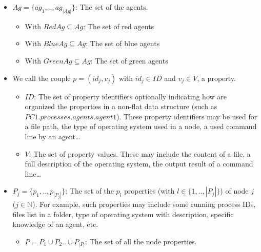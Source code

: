 \documentclass[conference]{IEEEtran}
\begin{document}
\begin{itemize}

    \item $Ag = \{ag_1,..,ag_{|Ag|}\}$: The set of the agents.
          \begin{itemize}
              \item With $RedAg \subseteq Ag$: The set of red agents
              \item With $BlueAg \subseteq Ag$: The set of blue agents
              \item With $GreenAg \subseteq Ag$: The set of green agents
          \end{itemize}

    \item We call the couple $p = (id_{j}, v_{j})$ with $id_j \in {ID}$ and $v_j \in V$, a property.
          \begin{itemize}
              \item $ID$: The set of property identifiers optionally indicating how are organized the properties in a non-flat data structure (such as $PC1.processes.agents.agent1$). These property identifiers may be used for a file path, the type of operating system used in a node, a used command line by an agent\dots
              \item $V$: The set of property values. These may include the content of a file, a full description of the operating system, the output result of a command line\dots
          \end{itemize}

    \item $P_{j} = \{ p_1, .., p_{|P_{j}|} \}$: The set of the $p_{l}$ properties (with $l \in \{1,..,|P_{j}|\}$) of node $j$ ($j \in \mathbb{N} $). For example, such properties may include some running process IDs, files list in a folder, type of operating system with description, specific knowledge of an agent, etc.
          \begin{itemize}
              \item $P = P_1 \cup P_2 .. \cup P_{|P|} $: The set of all the node properties.
          \end{itemize}


\end{itemize}
\end{document}
